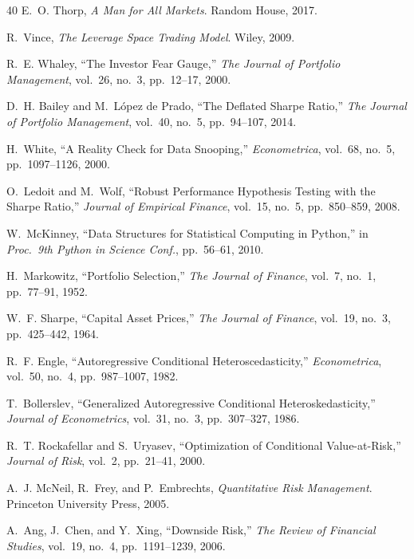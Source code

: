 \documentclass[12pt,a4paper]{article}
\begin{document}
\begin{thebibliography}{40}
E.~O. Thorp, \textit{A Man for All Markets}. Random House, 2017.

R.~Vince, \textit{The Leverage Space Trading Model}. Wiley, 2009.

R.~E. Whaley, ``The Investor Fear Gauge,'' \textit{The Journal of Portfolio Management}, vol.~26, no.~3, pp.~12--17, 2000.

D.~H. Bailey and M.~L\'{o}pez de Prado, ``The Deflated Sharpe Ratio,'' \textit{The Journal of Portfolio Management}, vol.~40, no.~5, pp.~94--107, 2014.

H.~White, ``A Reality Check for Data Snooping,'' \textit{Econometrica}, vol.~68, no.~5, pp.~1097--1126, 2000.

O.~Ledoit and M.~Wolf, ``Robust Performance Hypothesis Testing with the Sharpe Ratio,'' \textit{Journal of Empirical Finance}, vol.~15, no.~5, pp.~850--859, 2008.

W.~McKinney, ``Data Structures for Statistical Computing in Python,'' in \textit{Proc.~9th Python in Science Conf.}, pp.~56--61, 2010.

H.~Markowitz, ``Portfolio Selection,'' \textit{The Journal of Finance}, vol.~7, no.~1, pp.~77--91, 1952.

W.~F. Sharpe, ``Capital Asset Prices,'' \textit{The Journal of Finance}, vol.~19, no.~3, pp.~425--442, 1964.

R.~F. Engle, ``Autoregressive Conditional Heteroscedasticity,'' \textit{Econometrica}, vol.~50, no.~4, pp.~987--1007, 1982.

T.~Bollerslev, ``Generalized Autoregressive Conditional Heteroskedasticity,'' \textit{Journal of Econometrics}, vol.~31, no.~3, pp.~307--327, 1986.

R.~T. Rockafellar and S.~Uryasev, ``Optimization of Conditional Value-at-Risk,'' \textit{Journal of Risk}, vol.~2, pp.~21--41, 2000.

A.~J. McNeil, R.~Frey, and P.~Embrechts, \textit{Quantitative Risk Management}. Princeton University Press, 2005.

A.~Ang, J.~Chen, and Y.~Xing, ``Downside Risk,'' \textit{The Review of Financial Studies}, vol.~19, no.~4, pp.~1191--1239, 2006.


\end{thebibliography}
\end{document}
